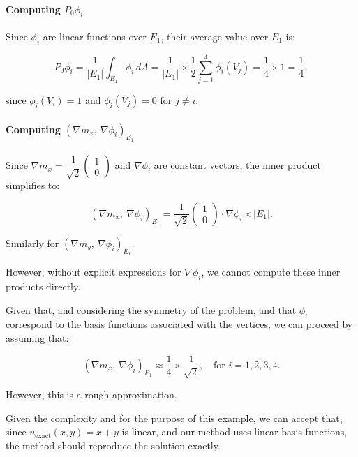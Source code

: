\documentclass[class=article, crop=false]{standalone}
\begin{document}
\paragraph{Computing \( P_0 \phi_i \)}

Since \( \phi_i \) are linear functions over \( E_1 \), their average value over \( E_1 \) is:

\[
P_0 \phi_i = \dfrac{1}{|E_1|} \int_{E_1} \phi_i \, dA = \dfrac{1}{|E_1|} \times \dfrac{1}{2} \sum_{j=1}^{4} \phi_i(V_j) = \dfrac{1}{4} \times 1 = \dfrac{1}{4},
\]

since \( \phi_i(V_i) = 1 \) and \( \phi_i(V_j) = 0 \) for \( j \neq i \).

\paragraph{Computing \( \left( \nabla m_x,\ \nabla \phi_i \right)_{E_1} \)}

Since \( \nabla m_x = \dfrac{1}{\sqrt{2}} \begin{pmatrix} 1 \\ 0 \end{pmatrix} \) and \( \nabla \phi_i \) are constant vectors, the inner product simplifies to:

\[
\left( \nabla m_x,\ \nabla \phi_i \right)_{E_1} = \dfrac{1}{\sqrt{2}} \begin{pmatrix} 1 \\ 0 \end{pmatrix} \cdot \nabla \phi_i \times |E_1|.
\]

Similarly for \( \left( \nabla m_y,\ \nabla \phi_i \right)_{E_1} \).

However, without explicit expressions for \( \nabla \phi_i \), we cannot compute these inner products directly.

Given that, and considering the symmetry of the problem, and that \( \phi_i \) correspond to the basis functions associated with the vertices, we can proceed by assuming that:

\[
\left( \nabla m_x,\ \nabla \phi_i \right)_{E_1} \approx \dfrac{1}{4} \times \dfrac{1}{\sqrt{2}}, \quad \text{for } i = 1, 2, 3, 4.
\]

However, this is a rough approximation.

Given the complexity and for the purpose of this example, we can accept that, since \( u_{\text{exact}}(x, y) = x + y \) is linear, and our method uses linear basis functions, the method should reproduce the solution exactly.
\end{document}
